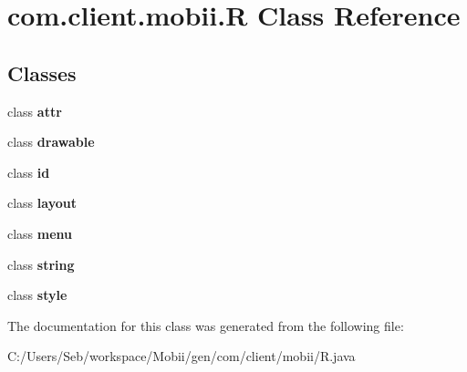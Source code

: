 \hypertarget{classcom_1_1client_1_1mobii_1_1_r}{\section{com.\-client.\-mobii.\-R Class Reference}
\label{classcom_1_1client_1_1mobii_1_1_r}
}
\subsection*{Classes}
\begin{DoxyCompactItemize}
\item 
class {\bfseries attr}
\item 
class {\bfseries drawable}
\item 
class {\bfseries id}
\item 
class {\bfseries layout}
\item 
class {\bfseries menu}
\item 
class {\bfseries string}
\item 
class {\bfseries style}
\end{DoxyCompactItemize}


The documentation for this class was generated from the following file\-:\begin{DoxyCompactItemize}
\item 
C\-:/\-Users/\-Seb/workspace/\-Mobii/gen/com/client/mobii/R.\-java\end{DoxyCompactItemize}
